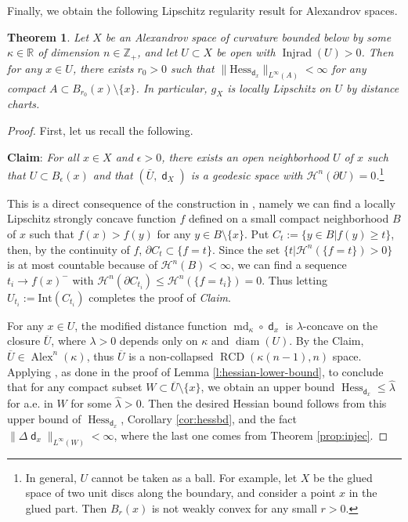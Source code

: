 \documentclass[11pt,reqno]{amsart}
\newtheorem{theorem}{Theorem}[section]
\theoremstyle{definition}
\numberwithin{equation}{section}
\newcommand{\dR}{\mathbb{R}}
\newcommand{\dZ}{\mathbb{Z}}
\DeclareMathOperator{\Alex}{Alex}
\DeclareMathOperator{\dist}{\mathsf{d}}
\DeclareMathOperator{\diam}{diam}
\DeclareMathOperator{\Hess}{Hess}
\DeclareMathOperator{\Injrad}{Injrad}
\DeclareMathOperator{\RCD}{RCD}
\DeclareMathOperator{\md}{md}
\newcommand{\haus}{\mathscr{H}}
\begin{document}
Finally, we obtain the following Lipschitz regularity result for Alexandrov spaces.
\begin{theorem}\label{alexandrovreg}
    Let $X$ be an Alexandrov space of curvature bounded below by some  $\kappa \in \dR$ of dimension $n\in \dZ_+$, and let $U \subset X$ be open with $\Injrad(U)>0$.  Then for any $x \in U$, there exists $r_0>0$ such that 
    $
        \|\mathrm{Hess}_{\dist_x}\|_{L^{\infty}(A)}<\infty$ for any compact $A \subset B_{r_0}(x) \setminus \{x\}$.
    In particular, $g_X$ is locally Lipschitz on $U$ by distance charts.
\end{theorem}
\begin{proof}
    First, let us recall the following.

    \smallskip

    \textbf{Claim}: \textit{For all $x \in X$ and $\epsilon>0$, there exists an open neighborhood $U$ of $x$ such that $U\subset B_{\epsilon}(x)$ and that $(\bar U, \dist_X)$ is a geodesic space with $\haus^n(\partial U)=0$.}\footnote{In general, $U$ cannot be taken as a ball. For example, let $X$ be the glued space of two unit discs along the boundary, and consider a point $x$ in the glued part. Then $B_r(x)$ is not weakly convex for any small $r>0$.}

    \smallskip

This is a direct consequence of the construction in \cite[Theorem 7.1.1 and Claim 7.1.2]{pet}, namely we can find a locally Lipschitz strongly concave function $f$ defined on a small compact neighborhood $B$ of $x$ such that $f(x)>f(y)$ for any $y \in B \setminus \{x\}$. Put $C_t:=\{y \in B| f(y) \ge t\}$, then, by the continuity of $f$, $\partial C_t \subset\{f=t\}$. Since the set $\{t| \haus^n(\{f=t\})>0\}$ is at most countable because of $\haus^n(B)<\infty$, we can find a sequence $t_i \to f(x)^-$ with $\haus^n(\partial C_{t_i}) \le \haus^n(\{f=t_i\})=0$. Thus letting $U_{t_i} := \mathrm{Int}(C_{t_i})$ completes the proof of \textit{Claim}.

For any $x \in U$, the modified distance function $\md_{\kappa} \circ \dist_x$ is $\lambda$-concave on the closure $\overline{U}$, where $\lambda > 0$ depends only on $\kappa$ and $\diam(U)$.  
   By the Claim, $\overline{U} \in \Alex^n(\kappa)$, thus $\overline{U}$ is a non-collapsed $\RCD(\kappa(n-1),n)$ space. Applying \cite[Theorem 4.7]{Kapovitch-Ketterer-NC},  as done in the proof of Lemma \ref{l:hessian-lower-bound}, to conclude that for any compact subset $W \subset \overline{U} \setminus \{x\}$, we obtain an upper bound $\Hess_{\dist_x} \leq \hat{\lambda}$ for a.e. in $W$ for some $\hat{\lambda}> 0$. 
Then the desired Hessian bound
 follows from this upper bound of  $\Hess_{\dist_x}$, Corollary \ref{cor:hessbd}, and the fact $\|\Delta \dist_x\|_{L^{\infty} (W)}  < \infty$, where the last one comes from Theorem \ref{prop:injec}. 
\end{proof}
\end{document}
